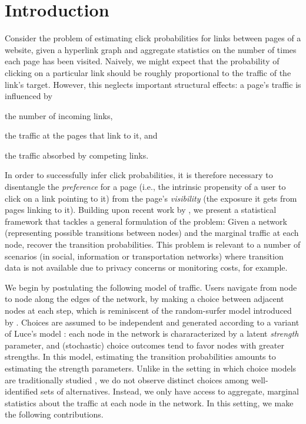 \section{Introduction}  %
\label{cr:sec:intro}

Consider the problem of estimating click probabilities for links between pages of a website, given a hyperlink graph and aggregate statistics on the number of times each page has been visited.
Naively, we might expect that the probability of clicking on a particular link should be roughly proportional to the traffic of the link's target.
However, this neglects important structural effects:
a page's traffic is influenced by
\begin{enuminline}
\item the number of incoming links,
\item the traffic at the pages that link to it, and
\item the traffic absorbed by competing links.
\end{enuminline}
In order to successfully infer click probabilities, it is therefore necessary to disentangle the \emph{preference} for a page (i.e., the intrinsic propensity of a user to click on a link pointing to it) from the page's \emph{visibility} (the exposure it gets from pages linking to it).
Building upon recent work by \citet{kumar2015inverting}, we present a statistical framework that tackles a general formulation of the problem:
Given a network (representing possible transitions between nodes) and the marginal traffic at each node, recover the transition probabilities.
This problem is relevant to a number of scenarios (in social, information or transportation networks) where transition data is not available due to privacy concerns or monitoring costs, for example.

We begin by postulating the following model of traffic.
Users navigate from node to node along the edges of the network, by making a choice between adjacent nodes at each step, which is reminiscent of the random-surfer model introduced by \citet{brin1998anatomy}.
Choices are assumed to be independent and generated according to a variant of Luce's model \citep{luce1959individual}: each node in the network is chararacterized by a latent \emph{strength} parameter, and (stochastic) choice outcomes tend to favor nodes with greater strengths.
In this model, estimating the transition probabilities amounts to estimating the strength parameters.
Unlike in the setting in which choice models are traditionally studied \citep{train2009discrete, vojnovic2016parameter}, we do not observe distinct choices among well-identified sets of alternatives.
Instead, we only have access to aggregate, marginal statistics about the traffic at each node in the network.
In this setting, we make the following contributions.

